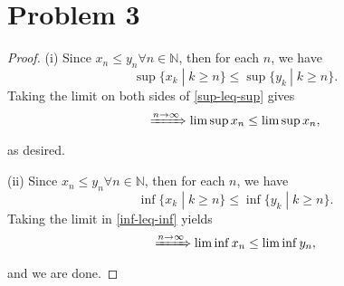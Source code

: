 \documentclass{article}
\begin{document}
\section*{Problem 3}
\begin{proof}
	(i) Since $x_n \leq y_n \forall n\in\mathbb{N}$, then for each $n$, we have
	\begin{equation}\label{sup-leq-sup}
		\sup \{x_k \;|\; k\geq n\} \leq \sup \{y_k \:|\; k\geq n\}.
	\end{equation}
	Taking the limit on both sides of \eqref{sup-leq-sup} gives
	\begin{equation}
		\xRightarrow{n\to\infty} \limsup x_n \leq \limsup x_n,
	\end{equation}
	as desired.
	
	(ii) Since $x_n \leq y_n \forall n \in \mathbb{N}$, then for each $n$, we have
	\begin{equation}\label{inf-leq-inf}
		\inf\{x_k \;|\; k\geq n\} \leq \inf \{y_k \;|\; k\geq n\}.
	\end{equation}
	Taking the limit in \eqref{inf-leq-inf} yields
	\begin{equation}
		\xRightarrow{n \to\infty} \liminf x_n \leq \liminf y_n,
	\end{equation}
	and we are done.
\end{proof}
\end{document}
